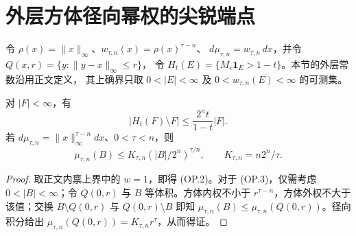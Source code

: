 \section{外层方体径向幂权的尖锐端点}\label{sec:op-power-endpoint}
令 $\rho(x)=\|x\|_\infty$、$w_{\tau,n}(x)=\rho(x)^{\tau-n}$、
$d\mu_{\tau,n}=w_{\tau,n}\,dx$，并令 $Q(x,r)=\{y:\|y-x\|_\infty\le r\}$，
令 $H_t(E)=\{M_c\mathbf1_E>1-t\}$。本节的外层常数沿用正文定义，
其上确界只取 $0<|E|<\infty$ 及 $0<w_{\tau,n}(E)<\infty$ 的可测集。

\begin{lemma}\label{lem:op-power-tools}
对 $|F|<\infty$，有
\[|H_t(F)\setminus F|\le\frac{2^nt}{1-t}|F|.\tag{OP.2}\]
若 $d\mu_{\tau,n}=\|x\|_\infty^{\tau-n}dx$、$0<\tau<n$，则
\[\mu_{\tau,n}(B)\le K_{\tau,n}\left(|B|/2^n\right)^{\tau/n},\qquad
K_{\tau,n}=n2^n/\tau.\tag{OP.3}\]
\end{lemma}
\begin{proof}
取正文内禀上界中的 $w=1$，即得 (OP.2)。对于 (OP.3)，仅需考虑 $0<|B|<\infty$；令
$Q(0,r)$ 与 $B$ 等体积。方体内权不小于 $r^{\tau-n}$，方体外权不大于
该值；交换 $B\setminus Q(0,r)$ 与 $Q(0,r)\setminus B$ 即知
$\mu_{\tau,n}(B)\le\mu_{\tau,n}(Q(0,r))$。径向积分给出
$\mu_{\tau,n}(Q(0,r))=K_{\tau,n}r^\tau$，从而得证。
\end{proof}

